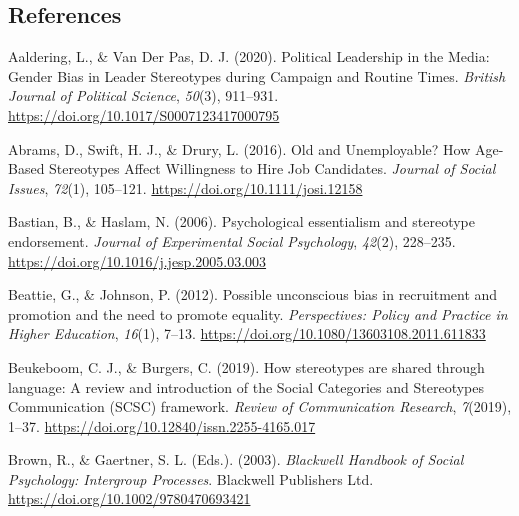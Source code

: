 \documentclass[
  12pt,
  letterpaper,
  DIV=11,
  numbers=noendperiod]{scrartcl}
\newlength{\cslhangindent}
\newlength{\cslentryspacingunit} %
\newenvironment{CSLReferences}[2] %
 {%
  \setlength{\parindent}{0pt}
  \ifodd #1
  \let\oldpar\par
  \def\par{\hangindent=\cslhangindent\oldpar}
  \fi
  \setlength{\parskip}{#2\cslentryspacingunit}
 }%
 {}
\begin{document}
\hypertarget{references}{%
\subsection*{References}\label{references}}

\hypertarget{refs}{}
\begin{CSLReferences}{1}{0}
\leavevmode{}%
Aaldering, L., \& Van Der Pas, D. J. (2020). Political {Leadership} in
the {Media}: {Gender Bias} in {Leader Stereotypes} during {Campaign} and
{Routine Times}. \emph{British Journal of Political Science},
\emph{50}(3), 911--931. \url{https://doi.org/10.1017/S0007123417000795}

\leavevmode{}%
Abrams, D., Swift, H. J., \& Drury, L. (2016). Old and {Unemployable}?
{How Age-Based Stereotypes Affect Willingness} to {Hire Job Candidates}.
\emph{Journal of Social Issues}, \emph{72}(1), 105--121.
\url{https://doi.org/10.1111/josi.12158}

\leavevmode{}%
Bastian, B., \& Haslam, N. (2006). Psychological essentialism and
stereotype endorsement. \emph{Journal of Experimental Social
Psychology}, \emph{42}(2), 228--235.
\url{https://doi.org/10.1016/j.jesp.2005.03.003}

\leavevmode{}%
Beattie, G., \& Johnson, P. (2012). Possible unconscious bias in
recruitment and promotion and the need to promote equality.
\emph{Perspectives: Policy and Practice in Higher Education},
\emph{16}(1), 7--13. \url{https://doi.org/10.1080/13603108.2011.611833}

\leavevmode{}%
Beukeboom, C. J., \& Burgers, C. (2019). How stereotypes are shared
through language: {A} review and introduction of the {Social Categories}
and {Stereotypes Communication} ({SCSC}) framework. \emph{Review of
Communication Research}, \emph{7}(2019), 1--37.
\url{https://doi.org/10.12840/issn.2255-4165.017}

\leavevmode{}%
Brown, R., \& Gaertner, S. L. (Eds.). (2003). \emph{Blackwell {Handbook}
of {Social Psychology}: {Intergroup Processes}}. {Blackwell Publishers
Ltd}. \url{https://doi.org/10.1002/9780470693421}


\end{CSLReferences}
\end{document}

